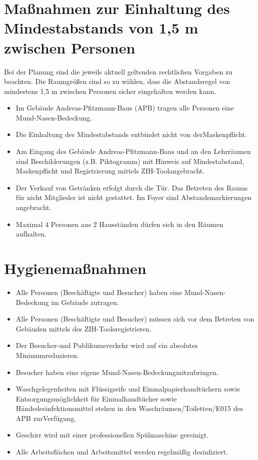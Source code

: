 \documentclass[12pt]{article}
\begin{document}
    \section{Maßnahmen zur Einhaltung des Mindestabstands von 1,5 m zwischen Personen}
        Bei der Planung sind die jeweils aktuell geltenden rechtlichen Vorgaben zu beachten.
        Die Raumgrößen sind so zu wählen, dass die Abstandsregel von mindestens 1,5 m zwischen Personen sicher eingehalten werden kann.
        \begin{itemize}
            \item Im Gebäude Andreas-Pfitzmann-Baus (APB) tragen alle Personen eine Mund-Nasen-Bedeckung.
            \item Die Einhaltung des Mindestabstands entbindet nicht von derMaskenpflicht.
            \item Am Eingang des Gebäude Andreas-Pfitzmann-Baus und an den Lehrräumen sind Beschilderungen (z.B. Piktogramm) mit Hinweis auf Mindestabstand, Maskenpflicht und Registrierung mittels ZIH-Toolangebracht.
            \item Der Verkauf von Getränken erfolgt durch die Tür. 
                Das Betreten des Raums für nicht Mitglieder ist nicht gestattet. 
                Im Foyer sind Abstandsmarkierungen angebracht.
            \item Maximal 4 Personen aus 2 Hausständen dürfen sich in den Räumen aufhalten. 
        \end{itemize}

        \begin{center}
            
        \end{center}

    \section{Hygienemaßnahmen}
        \begin{itemize}
            \item Alle Personen (Beschäftigte und Besucher) haben eine Mund-Nasen-Bedeckung im Gebäude zutragen.
            \item Alle Personen (Beschäftigte und Besucher) müssen sich vor dem Betreten von Gebäuden mittels des ZIH-Toolsregistrieren.
            \item Der Besucher-und Publikumsverkehr wird auf ein absolutes Minimumreduzieren.
            \item Besucher haben eine eigene Mund-Nasen-Bedeckungmitzubringen.
            \item Waschgelegenheiten mit Flüssigseife und Einmalpapierhandtüchern sowie Entsorgungsmöglichkeit für Einmalhandtücher sowie Händedesinfektionsmittel stehen in den Waschräumen/Toiletten/E015 des APB zurVerfügung.
            \item Geschirr wird mit einer professionellen Spülmaschine gereinigt.
            \item Alle Arbeitsflächen und Arbeitsmittel werden regelmäßig desinfiziert.
        \end{itemize}
\end{document}

